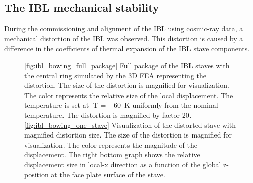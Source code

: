 \subsection{The IBL mechanical stability}
During the commissioning and alignment of the IBL using cosmic-ray data, a mechanical distortion of the IBL was observed. This distortion is caused by a difference in the coefficients of thermal expansion of the IBL stave components. 
\begin{figure}
\caption{\ref{fig:ibl_bowing_full_package} Full package of the IBL staves with the central ring simulated by the 3D FEA representing the distortion.
The size of the distortion is magnified for visualization. The color represents the relative size of the local
displacement. The temperature is set at T = \SI{-60}{\kelvin} uniformly from the nominal temperature. The distortion
is magnified by factor 20. \ref{fig:ibl_bowing_one_stave} Visualization of the distorted stave with magnified distortion size. The size of the
distortion is magnified for visualization. The color represents the magnitude of the displacement. The right bottom
graph shows the relative displacement size in local-x direction as a function of the global z-position at the face plate surface of the stave.}


\label{fig:ibl_bowing_staves}

\end{figure}
